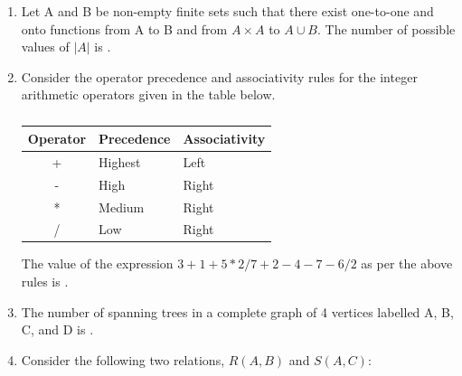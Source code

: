 \documentclass[a4paper, 11pt]{article}
\begin{document}
\begin{enumerate}
    \item Let A and B be non-empty finite sets such that there exist one-to-one and onto functions  from A to B and  from $A \times A$ to $A \cup B$. The number of possible values of $|A|$ is \underline{\hspace{2cm}}.
    \item Consider the operator precedence and associativity rules for the integer arithmetic operators given in the table below.
    
    \begin{table}[H]
        \centering
        \begin{tabular}{|c|l|l|}
        \hline
        \textbf{Operator} & \textbf{Precedence} & \textbf{Associativity} \\
        \hline
        + & Highest & Left \\
        \hline
        - & High & Right \\
        \hline
        * & Medium & Right \\
        \hline
        / & Low & Right \\
        \hline
        \end{tabular}
        \caption*{}
        \label{tab:q33}
    \end{table}
    
    The value of the expression $3+1+5*2/7+2-4-7-6/2$ as per the above rules is \underline{\hspace{2cm}}.
    \hfill{}

    \item The number of spanning trees in a complete graph of 4 vertices labelled A, B, C, and D is \underline{\hspace{2cm}}.

    \hfill{}

    \item Consider the following two relations, $R(A,B)$ and $S(A,C)$:
    

\end{enumerate}
\end{document}
